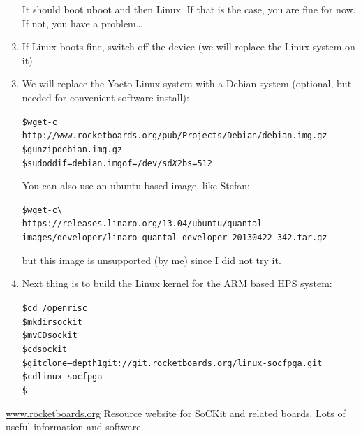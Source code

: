\documentclass[twoside]{article}
\begin{document}
\begin{enumerate}
  It should boot uboot and then Linux. If that is the case, you are
  fine for now. If not, you have a problem\dots

\item If Linux boots fine, switch off the device (we will replace the
  Linux system on it)

\item We will replace the Yocto Linux system with a Debian system
  (optional, but needed for convenient software install):
  \begin{alltt}
\$ wget -c
http://www.rocketboards.org/pub/Projects/Debian/debian.img.gz
\$ gunzip debian.img.gz
\$ sudo dd if=debian.img of=/dev/sd\emph{X}2 bs=512
  \end{alltt}

You can also use an ubuntu based image, like Stefan:
\begin{scriptsize}
  \begin{alltt}
\$ wget -c \textbackslash
https://releases.linaro.org/13.04/ubuntu/quantal-images/developer/linaro-quantal-developer-20130422-342.tar.gz
  \end{alltt}
\end{scriptsize}
but this image is unsupported (by me) since I did not try it.

\item Next thing is to build the Linux kernel for the ARM based HPS system:
  \begin{alltt}
\$ cd ~/openrisc
\$ mkdir sockit
\$ mv CD sockit
\$ cd sockit
\$ git clone --depth 1 git://git.rocketboards.org/linux-socfpga.git 
\$ cd linux-socfpga
\$ 
  \end{alltt}
\end{enumerate}


\begin{thebibliography}{99} 

 \url{www.rocketboards.org}
  Resource website for SoCKit and related boards. Lots of useful
  information and software.

\end{thebibliography}


\end{document}
